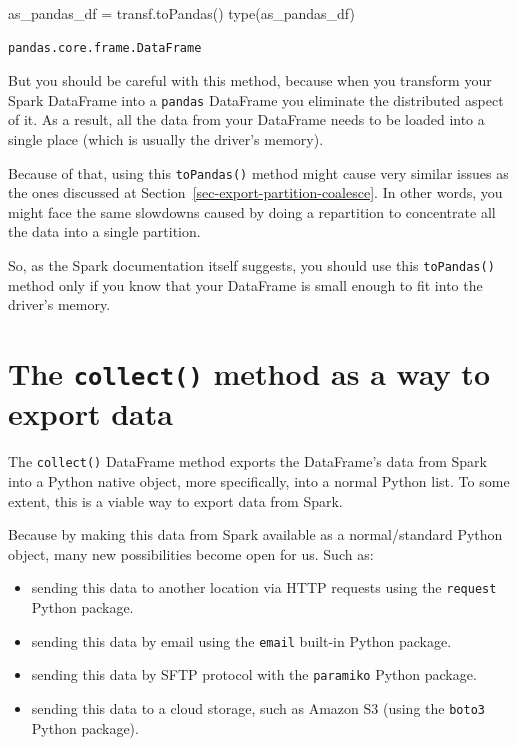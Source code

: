 \documentclass[
  11pt,
  letterpaper,
  DIV=11,
  numbers=noendperiod]{scrreprt}
\newenvironment{Shaded}{\begin{snugshade}}{\end{snugshade}}
\newcommand{\BuiltInTok}[1]{\textcolor[rgb]{0.00,0.23,0.31}{#1}}
\newcommand{\NormalTok}[1]{\textcolor[rgb]{0.00,0.23,0.31}{#1}}
\newcommand{\OperatorTok}[1]{\textcolor[rgb]{0.37,0.37,0.37}{#1}}
\providecommand{\tightlist}{%
  \setlength{\itemsep}{0pt}\setlength{\parskip}{0pt}}\usepackage{longtable,booktabs,array}
\begin{document}
\begin{Shaded}
\begin{Highlighting}[]
\NormalTok{as\_pandas\_df }\OperatorTok{=}\NormalTok{ transf.toPandas()}
\BuiltInTok{type}\NormalTok{(as\_pandas\_df)}
\end{Highlighting}
\end{Shaded}

\begin{verbatim}
pandas.core.frame.DataFrame
\end{verbatim}

But you should be careful with this method, because when you transform
your Spark DataFrame into a \texttt{pandas} DataFrame you eliminate the
distributed aspect of it. As a result, all the data from your DataFrame
needs to be loaded into a single place (which is usually the driver's
memory).

Because of that, using this \texttt{toPandas()} method might cause very
similar issues as the ones discussed at
Section~\ref{sec-export-partition-coalesce}. In other words, you might
face the same slowdowns caused by doing a repartition to concentrate all
the data into a single partition.

So, as the Spark documentation itself suggests, you should use this
\texttt{toPandas()} method only if you know that your DataFrame is small
enough to fit into the driver's memory.

\hypertarget{the-collect-method-as-a-way-to-export-data}{%
\section{\texorpdfstring{The \texttt{collect()} method as a way to
export
data}{The collect() method as a way to export data}}\label{the-collect-method-as-a-way-to-export-data}}

The \texttt{collect()} DataFrame method exports the DataFrame's data
from Spark into a Python native object, more specifically, into a normal
Python list. To some extent, this is a viable way to export data from
Spark.

Because by making this data from Spark available as a normal/standard
Python object, many new possibilities become open for us. Such as:

\begin{itemize}
\tightlist
\item
  sending this data to another location via HTTP requests using the
  \texttt{request} Python package.
\item
  sending this data by email using the \texttt{email} built-in Python
  package.
\item
  sending this data by SFTP protocol with the \texttt{paramiko} Python
  package.
\item
  sending this data to a cloud storage, such as Amazon S3 (using the
  \texttt{boto3} Python package).
\end{itemize}
\end{document}
